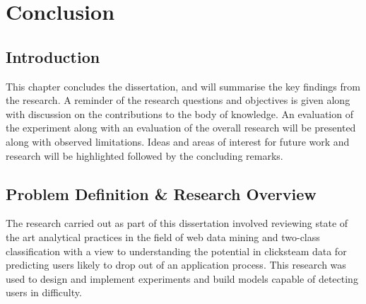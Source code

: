 \chapter{Conclusion} %

\label{Chapter5} %



\section{Introduction}
This chapter concludes the dissertation, and will summarise the key findings from the research. A reminder of the research questions and objectives is given along with discussion on the contributions to the body of knowledge.
An evaluation of the experiment along with an evaluation of the overall research will be presented along with observed limitations. Ideas and areas of interest for future work and research will be highlighted followed by the concluding remarks.




\section{Problem Definition \& Research Overview}
The research carried out as part of this dissertation involved reviewing state of the art analytical practices in the field of web data mining and two-class classification with a view to understanding the potential in clicksteam data for predicting users likely to drop out of an application process. This research was used to design and implement experiments and build models capable of detecting users in difficulty. 


